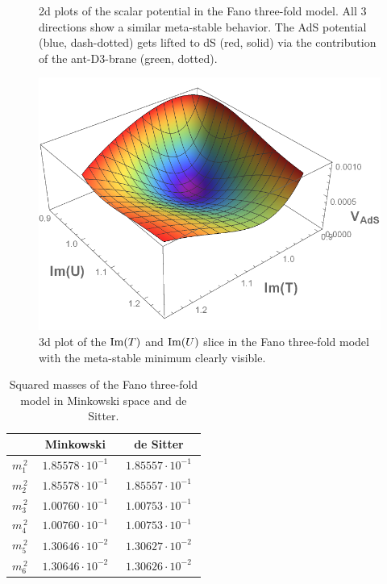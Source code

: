 \documentclass[a4paper,12pt]{report}
\def\rmim{{\rm Im}}
\begin{document}
\begin{figure}[H]
\caption{2d plots of the scalar potential in the Fano three-fold model. All 3 directions show a similar meta-stable behavior. The AdS potential (blue, dash-dotted) gets lifted to dS (red, solid) via the contribution of the ant-D3-brane (green, dotted).}
\label{fig:swiss2d}
\end{figure}

\begin{figure}[H]
\centering
\includegraphics[scale=0.78]{quevedo_38_3D_large.pdf}
\caption{3d plot of the $\rmim(T)$ and $\rmim(U)$ slice in the Fano three-fold model with the meta-stable minimum clearly visible.}
\label{fig:swiss3d}
\end{figure}

\begin{table}[htb]
\centering
\begin{tabular}{|c|c|c|}\hline
&  Minkowski  & de Sitter \\\hline
$m_1^{\,2}$ & $\; 1.85578 \cdot 10^{-1} \;$ & $\; 1.85557 \cdot 10^{-1} \;$\\\hline
$m_2^{\,2}$ & $\; 1.85578 \cdot 10^{-1} \;$ & $\; 1.85557 \cdot 10^{-1} \;$\\\hline
$m_3^{\,2}$ & $\; 1.00760 \cdot 10^{-1} \;$ & $\; 1.00753 \cdot 10^{-1} \;$\\\hline
$m_4^{\,2}$ & $\; 1.00760 \cdot 10^{-1} \;$ & $\; 1.00753 \cdot 10^{-1} \;$\\\hline
$m_5^{\,2}$ & $\; 1.30646 \cdot 10^{-2} \;$ & $\; 1.30627 \cdot 10^{-2} \;$\\\hline
$m_6^{\,2}$ & $\; 1.30646 \cdot 10^{-2} \;$ & $\; 1.30626 \cdot 10^{-2} \;$\\\hline
\end{tabular}
\caption{Squared masses of the Fano three-fold model in Minkowski space and de Sitter.}
\label{tab:swissmass}
\end{table}
\end{document}
